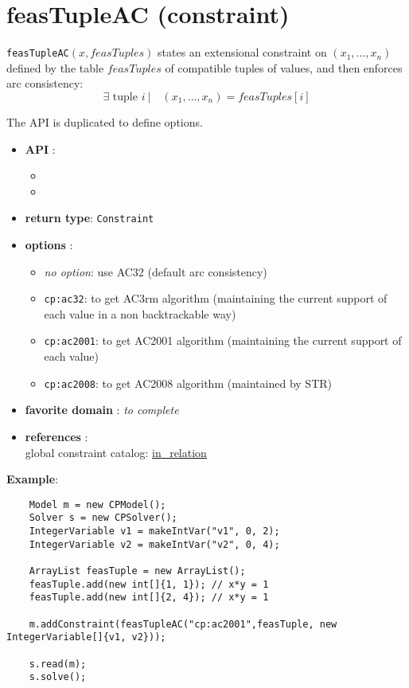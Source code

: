 \label{feastupleac}
\hypertarget{feastupleac}{}

\section{feasTupleAC (constraint)}\label{feastupleac:feastupleacconstraint}\hypertarget{feastupleac:feastupleacconstraint}{}
\begin{notedef}
  \texttt{feasTupleAC}$(x,feasTuples)$ states an extensional constraint on $(x_1,\ldots,x_n)$ defined by the table $feasTuples$ of compatible tuples of values, and then enforces arc consistency:
      $$\exists \text{ tuple } i\ |\quad (x_1,\ldots,x_n)=feasTuples[i]$$
\end{notedef}

The API is duplicated to define options.
\begin{itemize}
	\item \textbf{API} :
	\begin{itemize}
		\item {}
		\item {}
	\end{itemize}
	\item \textbf{return type}: \texttt{Constraint}
	\item \textbf{options} :
	\begin{itemize}
		\item \emph{no option}: use AC32 (default arc consistency)
		\item \texttt{cp:ac32}: to get AC3rm algorithm (maintaining the current support of each value in a non backtrackable way)
		\item \texttt{cp:ac2001}: to get AC2001 algorithm (maintaining the current support of each value)
		\item \texttt{cp:ac2008}: to get AC2008 algorithm (maintained by STR)
	\end{itemize}
	\item \textbf{favorite domain} : \emph{to complete}
	\item \textbf{references} :\\
      global constraint catalog: \href{http://www.emn.fr/x-info/sdemasse/gccat/Cin_relation.html}{in\_relation}
\end{itemize}

\textbf{Example}:
\begin{lstlisting}
	Model m = new CPModel();
	Solver s = new CPSolver();
	IntegerVariable v1 = makeIntVar("v1", 0, 2);
	IntegerVariable v2 = makeIntVar("v2", 0, 4);
	
	ArrayList feasTuple = new ArrayList();
	feasTuple.add(new int[]{1, 1}); // x*y = 1
	feasTuple.add(new int[]{2, 4}); // x*y = 1
	
	m.addConstraint(feasTupleAC("cp:ac2001",feasTuple, new IntegerVariable[]{v1, v2}));
	
	s.read(m);
	s.solve();
\end{lstlisting}
